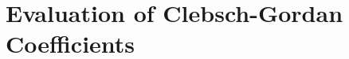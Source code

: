 \documentclass[12pt,a4paper]{article}
\begin{document}
\section{Evaluation of Clebsch-Gordan Coefficients}
\cite{greiner1994quantum} 
\end{document}
